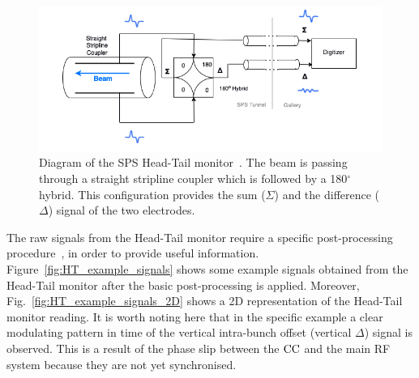 \begin{figure}[h]%
   \centering         
   \includegraphics[width=1.0\textwidth]{images/Ch4/HT_monitor_sketch.png}
       \caption{Diagram of the SPS Head-Tail monitor~\cite{Levens:2313358}. The beam is passing through a straight stripline coupler which is followed by a 180$^\circ$hybrid. This configuration provides the sum ($\Sigma$) and the difference ($\Delta$) signal of the two electrodes.} %
       \label{fig:SPS_HT_diagram}
\end{figure}

The raw signals from the Head-Tail monitor require a specific post-processing procedure~\cite{Levens:2313358}, in order to provide useful information. Figure~\ref{fig:HT_example_signals} shows some example signals obtained from the Head-Tail monitor after the basic post-processing is applied. Moreover, Fig.~\ref{fig:HT_example_signals_2D} shows a 2D representation of the Head-Tail monitor reading. It is worth noting here that in the specific example a clear modulating pattern in time of the vertical intra-bunch offset (vertical $\Delta$) signal is observed. This is a result of the phase slip between the ${\mathrm{CC}}$ and the main RF system because they are not yet synchronised. 

